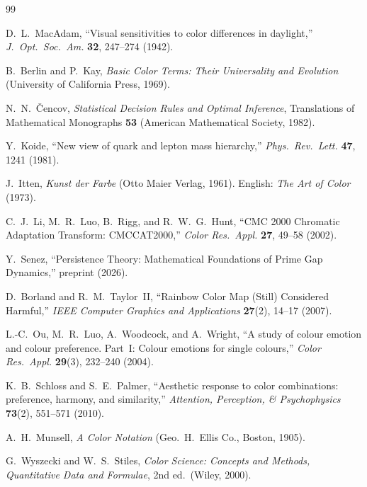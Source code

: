 \documentclass[12pt,a4paper]{article}
\begin{document}
\begin{thebibliography}{99}

D.~L.~MacAdam,
``Visual sensitivities to color differences in daylight,''
\textit{J.~Opt.~Soc.~Am.} \textbf{32}, 247--274 (1942).

B.~Berlin and P.~Kay,
\textit{Basic Color Terms: Their Universality and Evolution}
(University of California Press, 1969).

N.~N.~\v{C}encov,
\textit{Statistical Decision Rules and Optimal Inference},
Translations of Mathematical Monographs \textbf{53}
(American Mathematical Society, 1982).

Y.~Koide,
``New view of quark and lepton mass hierarchy,''
\textit{Phys.~Rev.~Lett.} \textbf{47}, 1241 (1981).

J.~Itten,
\textit{Kunst der Farbe} (Otto Maier Verlag, 1961).
English: \textit{The Art of Color} (1973).

C.~J.~Li, M.~R.~Luo, B.~Rigg, and R.~W.~G.~Hunt,
``CMC 2000 Chromatic Adaptation Transform: CMCCAT2000,''
\textit{Color Res.\ Appl.} \textbf{27}, 49--58 (2002).

Y.~Senez,
``Persistence Theory: Mathematical Foundations of Prime Gap Dynamics,''
preprint (2026).

D.~Borland and R.~M.~Taylor~II,
``Rainbow Color Map (Still) Considered Harmful,''
\textit{IEEE Computer Graphics and Applications} \textbf{27}(2), 14--17 (2007).

L.-C.~Ou, M.~R.~Luo, A.~Woodcock, and A.~Wright,
``A study of colour emotion and colour preference. Part~I: Colour
emotions for single colours,''
\textit{Color Res.\ Appl.} \textbf{29}(3), 232--240 (2004).

K.~B.~Schloss and S.~E.~Palmer,
``Aesthetic response to color combinations: preference, harmony, and
similarity,''
\textit{Attention, Perception, \& Psychophysics} \textbf{73}(2),
551--571 (2010).

A.~H.~Munsell,
\textit{A Color Notation} (Geo.~H.~Ellis Co., Boston, 1905).


G.~Wyszecki and W.~S.~Stiles,
\textit{Color Science: Concepts and Methods, Quantitative Data and
Formulae}, 2nd ed.\ (Wiley, 2000).


\end{thebibliography}
\end{document}
